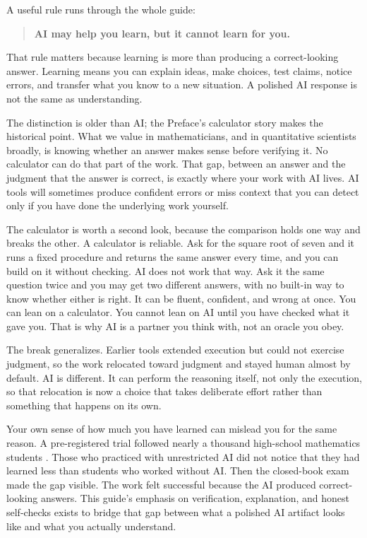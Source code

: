 \documentclass{SIAMbook2023}
\begin{document}
A useful rule runs through the whole guide:

\begin{quote}
\textbf{AI may help you learn, but it cannot learn for you.}
\end{quote}

That rule matters because learning is more than producing a correct-looking answer. Learning means you can explain ideas, make choices, test claims, notice errors, and transfer what you know to a new situation. A polished AI response is not the same as understanding.

The distinction is older than AI; the Preface's calculator story makes the historical point. What we value in mathematicians, and in quantitative scientists broadly, is knowing whether an answer makes sense before verifying it. No calculator can do that part of the work. That gap, between an answer and the judgment that the answer is correct, is exactly where your work with AI lives. AI tools will sometimes produce confident errors or miss context that you can detect only if you have done the underlying work yourself.

The calculator is worth a second look, because the comparison holds one way and breaks the other. A calculator is reliable. Ask for the square root of seven and it runs a fixed procedure and returns the same answer every time, and you can build on it without checking. AI does not work that way. Ask it the same question twice and you may get two different answers, with no built-in way to know whether either is right. It can be fluent, confident, and wrong at once. You can lean on a calculator. You cannot lean on AI until you have checked what it gave you. That is why AI is a partner you think with, not an oracle you obey.

The break generalizes. Earlier tools extended execution but could not exercise judgment, so the work relocated toward judgment and stayed human almost by default. AI is different. It can perform the reasoning itself, not only the execution, so that relocation is now a choice that takes deliberate effort rather than something that happens on its own.

Your own sense of how much you have learned can mislead you for the same reason. A pre-registered trial followed nearly a thousand high-school mathematics students \citep{bastani2025generative}. Those who practiced with unrestricted AI did not notice that they had learned less than students who worked without AI. Then the closed-book exam made the gap visible. The work felt successful because the AI produced correct-looking answers. This guide's emphasis on verification, explanation, and honest self-checks exists to bridge that gap between what a polished AI artifact looks like and what you actually understand.
\end{document}
